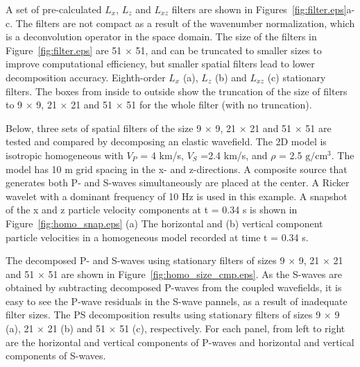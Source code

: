 \documentclass[manuscript,ulem,graphix,revised]{geophysics}
\begin{document}
A set of pre-calculated $L_x$, $L_z$ and $L_{xz}$ filters are shown in Figures~\ref{fig:filter.eps}a-c. The filters are not compact as a result of the wavenumber normalization, which is a deconvolution operator in the space domain. The size of the filters in Figure~\ref{fig:filter.eps} are 51 $\times$ 51, and can be truncated to smaller sizes to improve computational efficiency, but smaller spatial filters lead to lower decomposition accuracy. 
{
Eighth-order $L_x$ (a), $L_z$ (b) and $L_{xz}$ (c) stationary filters. The boxes from inside to outside show the truncation of the size of filters to 9 $\times$ 9, 21 $\times$ 21 and 51 $\times$ 51 for the whole filter (with no truncation).
}

Below, three sets of spatial filters of the size 9 $\times$ 9, 21 $\times$ 21 and 51 $\times$ 51 are tested and compared by decomposing an elastic wavefield. The 2D model is isotropic homogeneous with $V_P$ = 4 km/s, $V_S$ =2.4 km/s, and $\rho$ = 2.5 $\mathrm{g/cm^3}$. The model has 10 m grid spacing in the x- and z-directions. A composite source that generates both P- and S-waves simultaneously are placed at the center. A Ricker wavelet with a dominant frequency of 10 Hz is used in this example. A snapshot of the x and z particle velocity components at t = 0.34 s is shown in Figure~\ref{fig:homo_snap.eps}
{
(a) The horizontal and (b) vertical component particle velocities in a homogeneous model recorded at time t = 0.34 s.
}

The decomposed P- and S-waves using stationary filters of sizes 9 $\times$ 9, 21 $\times$ 21 and 51 $\times$ 51 are shown in Figure~\ref{fig:homo_size_cmp.eps}. As the S-waves are obtained by subtracting decomposed P-waves from the coupled wavefields, it is easy to see the P-wave residuals in the S-wave pannels, as a result of inadequate filter sizes.
{
The PS decomposition results using stationary filters of sizes 9 $\times$ 9 (a), 21 $\times$ 21 (b) and 51 $\times$ 51 (c), respectively. For each panel, from left to right are the horizontal and vertical components of P-waves and horizontal and vertical components of S-waves.
}
  
\end{document}
